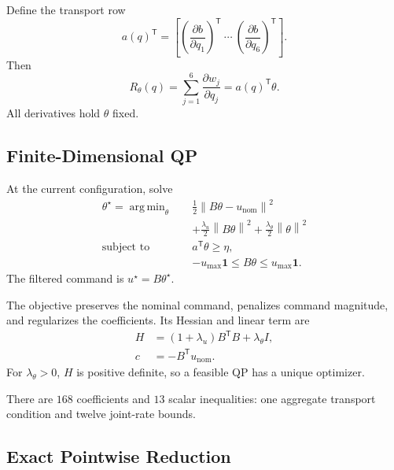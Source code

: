 \documentclass[conference]{IEEEtran}
\newcommand{\trans}{^{\mathsf T}}
\newcommand{\norm}[1]{\left\lVert#1\right\rVert}
\DeclareMathOperator*{\argmin}{arg\,min}
\begin{document}
Define the transport row
\begin{equation}
    a(q)\trans=
    \left[
        \left(\frac{\partial b}{\partial q_1}\right)\trans
        \ \cdots\
        \left(\frac{\partial b}{\partial q_6}\right)\trans
    \right].
\end{equation}
Then
\begin{equation}
    R_\theta(q)
    =
    \sum_{j=1}^{6}\frac{\partial w_j}{\partial q_j}
    =
    a(q)\trans\theta.
    \label{eq:linear-residual}
\end{equation}
All derivatives hold $\theta$ fixed.

\subsection{Finite-Dimensional QP}

At the current configuration, solve
\begin{equation}
\begin{aligned}
    \theta^\star=\argmin_\theta\quad&
    \frac12\norm{B\theta-u_{\mathrm{nom}}}^2\\
    &+\frac{\lambda_u}{2}\norm{B\theta}^2
    +\frac{\lambda_\theta}{2}\norm{\theta}^2\\
    \text{subject to}\quad&
    a\trans\theta\geq\eta,\\
    &-u_{\max}\mathbf1
    \leq B\theta\leq u_{\max}\mathbf1.
    \label{eq:qp}
\end{aligned}
\end{equation}
The filtered command is $u^\star=B\theta^\star$.

The objective preserves the nominal command,
penalizes command magnitude, and regularizes
the coefficients. Its Hessian and linear term are
\begin{align}
    H&=(1+\lambda_u)B\trans B+\lambda_\theta I,\\
    c&=-B\trans u_{\mathrm{nom}}.
\end{align}
For $\lambda_\theta>0$, $H$ is positive definite,
so a feasible QP has a unique optimizer.

There are $168$ coefficients and $13$ scalar
inequalities: one aggregate transport condition
and twelve joint-rate bounds.

\subsection{Exact Pointwise Reduction}
\end{document}
